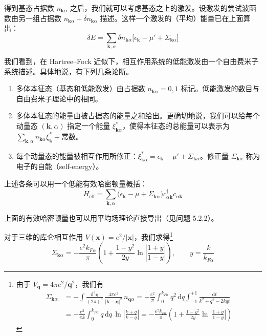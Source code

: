 得到基态占据数 $n_{\pmb{k}\alpha}$ 之后，我们就可以考虑基态之上的激发。设激发的尝试波函数由另一组占据数 $n_{\pmb{k}\alpha}+\delta n_{\pmb{k}\alpha}$ 描述。这样一个激发的（平均）能量已在上面算出：
\begin{equation*}
\delta E = \sum_{\pmb{k},\alpha} \delta n_{\pmb{k}\alpha} \big[ \epsilon_{\pmb{k}} - \mu' + \Sigma_{\pmb{k}\alpha} \big] \tag{5.2.6}
\end{equation*}

我们看到，在 Hartree--Fock 近似下，相互作用系统的低能激发由一个自由费米子系统描述。具体地说，有下列几条论断。

\begin{enumerate}
\item 多体本征态（基态和低能激发）由占据数 $n_{\pmb{k}\alpha}=0,1$ 标记。低能激发的数目与自由费米子理论中的相同。
\item 多体本征态的能量由被占据态的能量之和给出。更确切地说，我们可以给每个动量态 $(\pmb{k},\alpha)$ 指定一个能量 $\xi^{*}_{\pmb{k}\alpha}$，使得本征态的总能量可以表示为 $\sum_{\pmb{k},\alpha} n_{\pmb{k}\alpha}\xi^{*}_{\pmb{k}} + \text{常数}$。
\item 每个动量态的能量被相互作用所修正：$\xi^{*}_{\pmb{k}\alpha} = \epsilon_{\pmb{k}} - \mu' + \Sigma_{\pmb{k}\alpha}$。修正量 $\Sigma_{\pmb{k}\alpha}$ 称为电子的自能（self-energy）。
\end{enumerate}

上述各条可以用一个低能有效哈密顿量概括：
\begin{equation*}
H_{\mathrm{eff}} = \sum_{\pmb{k},\alpha} \big( \epsilon_{\pmb{k}} - \mu + \Sigma_{\pmb{k}\alpha} \big) c^{\dagger}_{\alpha\pmb{k}} c_{\alpha\pmb{k}} \tag{5.2.7}
\end{equation*}

上面的有效哈密顿量也可以用平均场理论直接导出（见问题 5.2.2）。

对于三维的库仑相互作用 $V(\pmb{x}) = e^{2}/|\pmb{x}|$，我们求得\footnote{由于 $V_{\pmb{q}} = 4\pi e^{2}/\pmb{q}^{2}$，我们有
\begin{align*}
\Sigma_{\pmb{k}\alpha} &= -\int \frac{\mathrm{d}^{3}\pmb{q}}{(2\pi)^{3}}\, \frac{4\pi e^{2}}{|\pmb{k}-\pmb{q}|^{2}}\, n_{\pmb{q}\alpha} = -\frac{e^{2}}{\pi} \int_{0}^{k_{F\alpha}} q^{2}\,\mathrm{d}q \int_{-1}^{+1} \frac{\mathrm{d}t}{k^{2}+q^{2}-2kqt}\\
&= -\frac{e^{2}}{\pi k} \int_{0}^{k_{F\alpha}} q\,\mathrm{d}q\, \ln\left| \frac{k+q}{k-q} \right| = -\frac{e^{2}k_{F\alpha}}{\pi} \left( 1 + \frac{1-y^{2}}{2y} \ln\left| \frac{1+y}{1-y} \right| \right)
\end{align*}}
\begin{equation*}
\Sigma_{\pmb{k}\alpha} = -\frac{e^{2}k_{F\alpha}}{\pi} \left( 1 + \frac{1-y^{2}}{2y} \ln\left| \frac{1+y}{1-y} \right| \right), \qquad y = \frac{k}{k_{F\alpha}} \tag{5.2.8}
\end{equation*}

